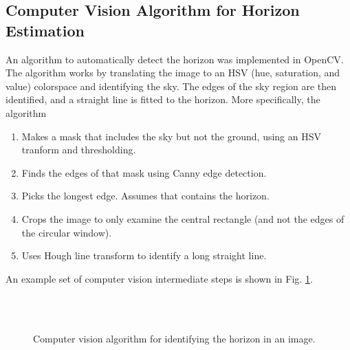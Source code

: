\documentclass{article}
\begin{document}
\subsection{Computer Vision Algorithm for Horizon Estimation}
\label{sec:cvalg}
An algorithm to automatically detect the horizon was implemented in OpenCV. The algorithm works by translating the image to an HSV (hue, saturation, and value) colorspace and identifying the sky. The edges of the sky region are then identified, and a straight line is fitted to the horizon. More specifically, the algorithm
\begin{enumerate}
    \item Makes a mask that includes the sky but not the ground, using an HSV tranform and thresholding.
    \item Finds the edges of that mask using Canny edge detection.
    \item Picks the longest edge. Assumes that contains the horizon.
    \item Crops the image to only examine the central rectangle (and not the edges of the circular window).
    \item Uses Hough line transform to identify a long straight line.
\end{enumerate}

An example set of computer vision intermediate steps is shown in Fig. \ref{fig:cv_alg}.

\begin{figure}[H]%
 \centering
 \\
 \\
 \caption{Computer vision algorithm for identifying the horizon in an image.}%
 \label{fig:cv_alg}%
\end{figure}
\end{document}
